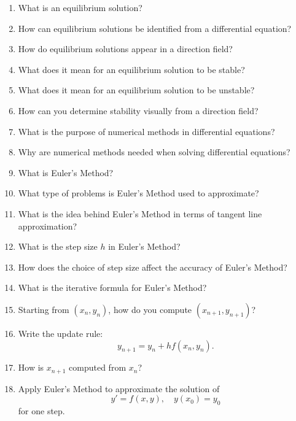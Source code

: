 \begin{enumerate}
\item What is an equilibrium solution?

\item How can equilibrium solutions be identified from a differential equation?

\item How do equilibrium solutions appear in a direction field?

\item What does it mean for an equilibrium solution to be stable?

\item What does it mean for an equilibrium solution to be unstable?

\item How can you determine stability visually from a direction field?

\item What is the purpose of numerical methods in differential equations?

\item Why are numerical methods needed when solving differential equations?

\item What is Euler’s Method?

\item What type of problems is Euler’s Method used to approximate?

\item What is the idea behind Euler’s Method in terms of tangent line approximation?

\item What is the step size $h$ in Euler’s Method?

\item How does the choice of step size affect the accuracy of Euler’s Method?

\item What is the iterative formula for Euler’s Method?

\item Starting from $(x_n, y_n)$, how do you compute $(x_{n+1}, y_{n+1})$?

\item Write the update rule:
  \[
    y_{n+1} = y_n + h f(x_n, y_n).
  \]

\item How is $x_{n+1}$ computed from $x_n$?

\item Apply Euler’s Method to approximate the solution of
  \[
    y' = f(x,y), \quad y(x_0)=y_0
  \]
  for one step.


\end{enumerate}

